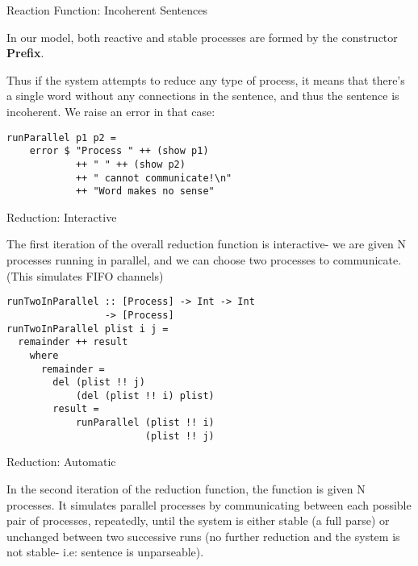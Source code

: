 \documentclass{beamer}
\begin{document}
\begin{frame}[fragile]{Reaction Function: Incoherent Sentences}

In our model, both reactive and stable processes are formed by the constructor \textbf{Prefix}.

Thus if the system attempts to reduce any type of process, it means that there's a single
word without any connections in the sentence, and thus the sentence is incoherent. We raise
an error in that case:  

\begin{lstlisting}
runParallel p1 p2 = 
	error $ "Process " ++ (show p1) 
            ++ " " ++ (show p2)
            ++ " cannot communicate!\n"
            ++ "Word makes no sense" 
\end{lstlisting}

\end{frame}

\begin{frame}[fragile]{Reduction: Interactive}

The first iteration of the overall reduction function is interactive- we are given N processes running in parallel, and we can choose two processes to communicate. (This simulates FIFO channels)

\begin{lstlisting}
runTwoInParallel :: [Process] -> Int -> Int 
                 -> [Process]
runTwoInParallel plist i j =
  remainder ++ result
	where 
	  remainder = 
		del (plist !! j) 
			(del (plist !! i) plist)
		result = 
			runParallel (plist !! i) 
			            (plist !! j)
\end{lstlisting}

\end{frame}

\begin{frame}[fragile]{Reduction: Automatic}

In the second iteration of the reduction function, the function is given N processes. It simulates parallel processes by communicating between each possible pair of processes, repeatedly, until the system is either stable (a full parse) or unchanged between two successive runs (no further reduction and the system is not stable- i.e: sentence is unparseable).


\end{frame}
\end{document}
